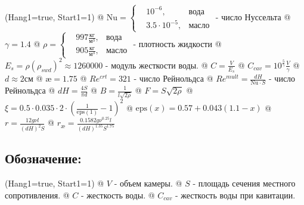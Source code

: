 \documentclass[12pt, a4paper]{article}
\begin{document}
\noindent\begin{easylist}
\ListProperties(Hang1=true, Start1=1)
@ $ \mathrm{Nu} = \left\{
\begin{aligned}
& 10^{-6},  &\text{вода} \\
& 3.5 \cdot 10^{-5}, &\text{масло}
\end{aligned}
\right. $ - число Нуссельта
@ $ \gamma = 1.4 $
@ $ \rho = \left\{
\begin{aligned}
& 997 \frac{\text{кг}}{\text{м}^3},  &\text{вода} \\
& 905 \frac{\text{кг}}{\text{м}^3}, &\text{масло}
\end{aligned}
\right. $ - плотность жидкости
@ $ E_s = \rho (\rho_{swd})^2 \approx 1260000 $ - модуль жесткости воды.
@ $ C = \frac{V}{E_s} $
@ $ C_{cav} = 10^{\frac5\gamma}\frac{V}{\gamma} $
@ $ d \approx 2 \text{см} $
@ $ \text{\ae} = 1.75 $
@ $ Re^{crt} = 321 $ - число Рейнольдса
@ $ Re^{mult} = \frac{dH}{\mathrm{Nu} \cdot S} $ - число Рейнольдса
@ $ dH = \frac{4S}{\pi d} $
@ $ B = \frac{1}{l\sqrt{2\rho}} $
@ $ F = S\sqrt{2\rho} $
@ $ \xi = 0.5 \cdot 0.035 \cdot 2 \cdot (\frac{1}{\mathrm{eps}(1)} - 1)^2 $
@ $ \mathrm{eps}(x) = 0.57 + 0.043(1.1 - x) $
@ $ r = \frac{12g\nu l}{(dH)^2 S} $
@ $ r_\text{\ae} = \frac{0.1582 g \nu^{0.25} l}{(dH)^{1.35} S^{1.75}} $
\end{easylist}




\subsection{Обозначение:}

\noindent\begin{easylist}
\ListProperties(Hang1=true, Start1=1)
@ $ V $ - объем камеры. 
@ $ S $ - площадь сечения местного сопротивления.
@ $ C $ - жесткость воды.
@ $ C_{cav} $ - жесткость воды при кавитации.
\end{easylist}
\end{document}
